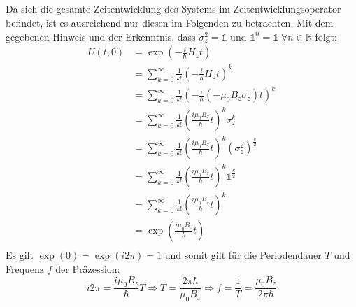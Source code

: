 \documentclass[a4paper,11pt]{article}
\begin{document}
\subsection{}
Da sich die gesamte Zeitentwicklung des Systems im Zeitentwicklungsoperator befindet, ist es ausreichend nur diesen im Folgenden zu betrachten.
Mit dem gegebenen Hinweis und der Erkenntnis, dass $\sigma_z^2 = \mathbb{1}$ und $\mathbb{1}^n = \mathbb{1} \;\forall n \in \mathbb{R}$ folgt:
\begin{equation}
        \begin{aligned}
                U(t, 0) &= \exp\left(-\frac{i}{\hbar}H_zt\right) \\
                        &= \sum_{k=0}^\infty \frac{1}{k!}\left(-\frac{i}{\hbar} H_zt\right)^k \\
                        &= \sum_{k=0}^\infty \frac{1}{k!}\left(-\frac{i}{\hbar} (-\mu_0B_z\sigma_z)t\right)^k \\
                        &= \sum_{k=0}^\infty \frac{1}{k!}\left(\frac{i\mu_0B_z}{\hbar}t\right)^k \sigma_z^k \\
                        &= \sum_{k=0}^\infty \frac{1}{k!}\left(\frac{i\mu_0B_z}{\hbar}t\right)^k (\sigma_z^2)^\frac{k}{2} \\
                        &= \sum_{k=0}^\infty \frac{1}{k!}\left(\frac{i\mu_0B_z}{\hbar}t\right)^k \mathbb{1}^\frac{k}{2} \\
                        &= \sum_{k=0}^\infty \frac{1}{k!}\left(\frac{i\mu_0B_z}{\hbar}t\right)^k \\
                        &= \exp\left(\frac{i\mu_0B_z}{\hbar}t\right) \\
        \end{aligned}
\end{equation}
Es gilt $\exp(0) = \exp(i2\pi) = 1$ und somit gilt für die Periodendauer $T$ und Frequenz $f$ der Präzession:
\begin{equation}
        i2\pi = \frac{i\mu_0B_z}{\hbar}T \Rightarrow T = \frac{2\pi\hbar}{\mu_0B_z} \Rightarrow f = \frac{1}{T} = \frac{\mu_0B_z}{2\pi\hbar}
\end{equation}
\end{document}

